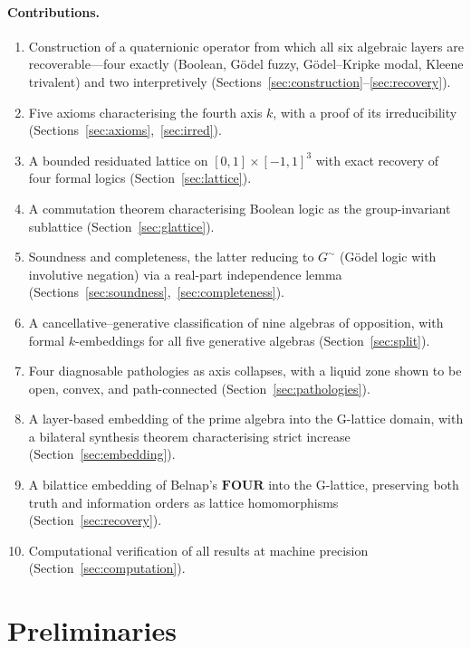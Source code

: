 \documentclass[11pt,a4paper]{article}
\newcommand{\recu}[1]{{\color{kcolor}#1}}
\def\recu#1{#1}%
\begin{document}
\paragraph{Contributions.}
\begin{enumerate}[nosep]
\item Construction of a quaternionic operator from which all six
  algebraic layers are recoverable---four exactly (Boolean,
  G\"odel fuzzy, G\"odel--Kripke modal, Kleene trivalent) and
  two interpretively
  (Sections~\ref{sec:construction}--\ref{sec:recovery}).
\item Five axioms characterising the fourth axis $\recu{k}$, with
  a proof of its irreducibility
  (Sections~\ref{sec:axioms},~\ref{sec:irred}).
\item A bounded residuated lattice on $[0,1]\times[-1,1]^3$
  with exact recovery of four formal logics
  (Section~\ref{sec:lattice}).
\item A commutation theorem characterising Boolean logic as the
  group-invariant sublattice (Section~\ref{sec:glattice}).
\item Soundness and completeness, the latter reducing to
  $G^\sim$ (G\"odel logic with involutive negation) via a
  real-part independence lemma
  (Sections~\ref{sec:soundness},~\ref{sec:completeness}).
\item A cancellative--generative classification of nine algebras
  of opposition, with formal $\recu{k}$-embed\-dings for all five
  generative algebras
  (Section~\ref{sec:split}).
\item Four diagnosable pathologies as axis collapses, with a
  liquid zone shown to be open, convex, and path-connected
  (Section~\ref{sec:pathologies}).
\item A layer-based embedding of the prime algebra into the
  G-lattice domain, with a bilateral synthesis theorem
  characterising strict increase
  (Section~\ref{sec:embedding}).
\item A bilattice embedding of Belnap's $\mathbf{FOUR}$ into the
  G-lattice, preserving both truth and information orders as lattice
  homomorphisms (Section~\ref{sec:recovery}).
\item Computational verification of all results at machine precision
  (Section~\ref{sec:computation}).
\end{enumerate}

\section{Preliminaries}
\label{sec:prelim}
\end{document}
